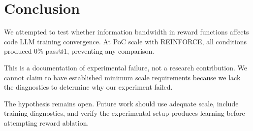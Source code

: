 \section{Conclusion}

We attempted to test whether information bandwidth in reward functions affects code LLM training convergence. At PoC scale with REINFORCE, all conditions produced 0\% pass@1, preventing any comparison.

This is a documentation of experimental failure, not a research contribution. We cannot claim to have established minimum scale requirements because we lack the diagnostics to determine why our experiment failed.

The hypothesis remains open. Future work should use adequate scale, include training diagnostics, and verify the experimental setup produces learning before attempting reward ablation.
